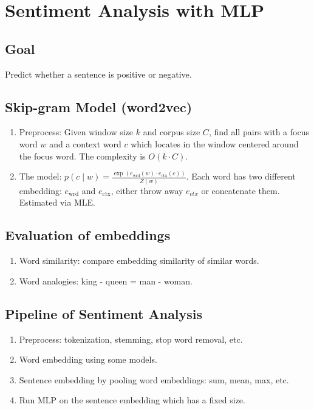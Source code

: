 \section{Sentiment Analysis with MLP}

\subsection*{Goal}

Predict whether a sentence is positive or negative.

\subsection*{Skip-gram Model (word2vec)}

\begin{enumerate}
    \item Preprocess: Given window size $k$ and corpus size $C$, find all pairs with a focus word $w$ and a context word $c$ which locates in the window centered around the focus word. The complexity is $O(k\cdot C)$.
    \item The model: $p(c\mid w)=\frac{\exp(e_{\text{wrd}}(w)\cdot e_{\text{ctx}}(c))}{Z(w)}$. Each word has two different embedding: $e_{\text{wrd}}$ and $e_{\text{ctx}}$, either throw away $e_{ctx}$ or concatenate them. Estimated via MLE.
\end{enumerate}

\subsection*{Evaluation of embeddings}

\begin{enumerate}
    \item Word similarity: compare embedding similarity of similar words.
    \item Word analogies: king - queen = man - woman.
\end{enumerate}

\subsection*{Pipeline of Sentiment Analysis}

\begin{enumerate}
    \item Preprocess: tokenization, stemming, stop word removal, etc.
    \item Word embedding using some models.
    \item Sentence embedding by pooling word embeddings: sum, mean, max, etc.
    \item Run MLP on the sentence embedding which has a fixed size.
\end{enumerate}